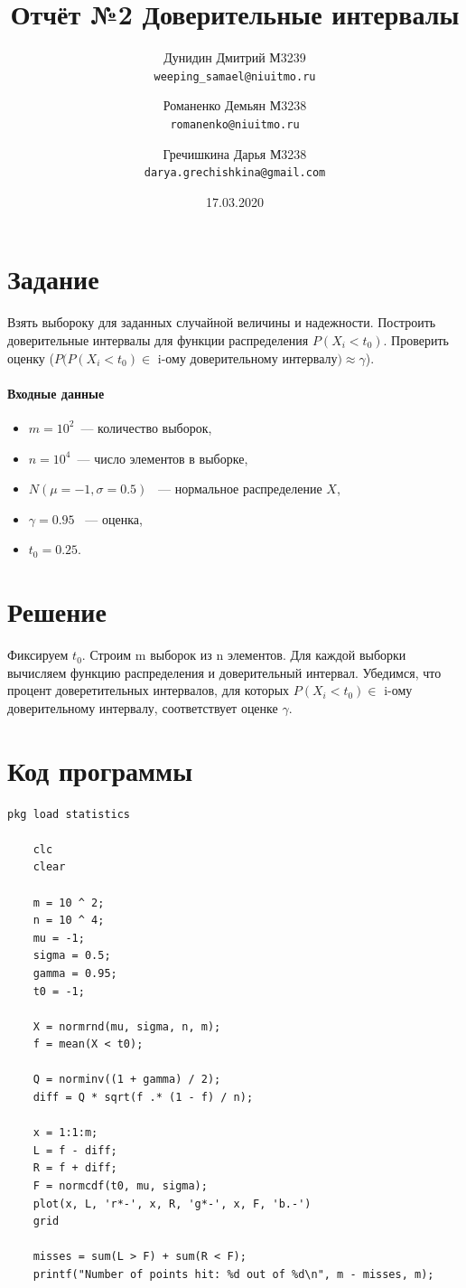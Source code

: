 \documentclass{article}
\title{\textbf{Отчёт №2} Доверительные интервалы}
\author{
    Дунидин Дмитрий М3239\\
    \texttt{weeping\_samael@niuitmo.ru}
    \and
    Романенко Демьян М3238\\
    \texttt{romanenko@niuitmo.ru}
    \and
    Гречишкина Дарья М3238\\
    \texttt{darya.grechishkina@gmail.com}
}
\date{17.03.2020}
\begin{document}
	\maketitle
	\newpage

\maketitle
    \section{Задание}
        Взять выбороку для заданных случайной величины и надежности. Построить доверительные интервалы для функции распределения $P(X_i < t_0)$. Проверить оценку ($P(P(X_i < t_0) \in$ i-ому доверительному интервалу$) \approx \gamma$).
        \paragraph{Входные данные}
            \begin{itemize}
                \item $m = 10^2$~--- количество выборок,
                \item $n = 10^4$~--- число элементов в выборке,
                \item $N(\mu = -1, \sigma = 0.5)$ ~--- нормальное распределение $X$,
                \item $\gamma = 0.95$ ~--- оценка,
                \item $t_0 = 0.25$.
            \end{itemize}
    \section{Решение}
        Фиксируем $t_0$. Строим m выборок из n элементов. Для каждой выборки вычисляем функцию распределения и доверительный интервал. Убедимся, что процент доверетительных интервалов, для которых $P(X_i < t_0) \in$ i-ому доверительному интервалу, соответствует оценке $\gamma$.
    \section{Код программы}
\begin{lstlisting}[caption={solution.m}]
    pkg load statistics

    clc
    clear
    
    m = 10 ^ 2;
    n = 10 ^ 4;
    mu = -1;
    sigma = 0.5;
    gamma = 0.95;
    t0 = -1;
    
    X = normrnd(mu, sigma, n, m);
    f = mean(X < t0);
    
    Q = norminv((1 + gamma) / 2);
    diff = Q * sqrt(f .* (1 - f) / n);
    
    x = 1:1:m;
    L = f - diff;
    R = f + diff;
    F = normcdf(t0, mu, sigma);
    plot(x, L, 'r*-', x, R, 'g*-', x, F, 'b.-')
    grid
    
    misses = sum(L > F) + sum(R < F);
    printf("Number of points hit: %d out of %d\n", m - misses, m);
\end{lstlisting}
\end{document}
